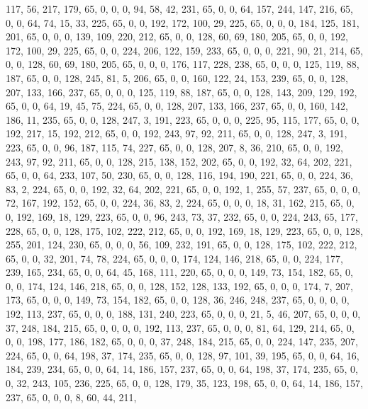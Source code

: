 \begin{DoxyCode}
       117, 56, 217, 179, 65, 0, 0, 0, 94, 58, 42, 231, 65, 0, 0, 64, 157, 244, 147, 216, 65, 0, 0, 64, 74, 15, 33,
       225, 65, 0, 0, 192, 172, 100, 29, 225, 65, 0, 0, 0, 184, 125, 181, 201, 65, 0, 0, 0, 139, 109, 220, 212, 65,
       0, 0, 128, 60, 69, 180, 205, 65, 0, 0, 192, 172, 100, 29, 225, 65, 0, 0, 224, 206, 122, 159, 233, 65, 0, 0,
       0, 221, 90, 21, 214, 65, 0, 0, 128, 60, 69, 180, 205, 65, 0, 0, 0, 176, 117, 228, 238, 65, 0, 0, 0, 125, 119,
       88, 187, 65, 0, 0, 128, 245, 81, 5, 206, 65, 0, 0, 160, 122, 24, 153, 239, 65, 0, 0, 128, 207, 133, 166,
       237, 65, 0, 0, 0, 125, 119, 88, 187, 65, 0, 0, 128, 143, 209, 129, 192, 65, 0, 0, 64, 19, 45, 75, 224, 65, 0,
       0, 128, 207, 133, 166, 237, 65, 0, 0, 160, 142, 186, 11, 235, 65, 0, 0, 128, 247, 3, 191, 223, 65, 0, 0, 0,
       225, 95, 115, 177, 65, 0, 0, 192, 217, 15, 192, 212, 65, 0, 0, 192, 243, 97, 92, 211, 65, 0, 0, 128, 247, 3,
       191, 223, 65, 0, 0, 96, 187, 115, 74, 227, 65, 0, 0, 128, 207, 8, 36, 210, 65, 0, 0, 192, 243, 97, 92, 211,
       65, 0, 0, 128, 215, 138, 152, 202, 65, 0, 0, 192, 32, 64, 202, 221, 65, 0, 0, 64, 233, 107, 50, 230, 65, 0,
       0, 128, 116, 194, 190, 221, 65, 0, 0, 224, 36, 83, 2, 224, 65, 0, 0, 192, 32, 64, 202, 221, 65, 0, 0, 192,
       1, 255, 57, 237, 65, 0, 0, 0, 72, 167, 192, 152, 65, 0, 0, 224, 36, 83, 2, 224, 65, 0, 0, 0, 18, 31, 162,
       215, 65, 0, 0, 192, 169, 18, 129, 223, 65, 0, 0, 96, 243, 73, 37, 232, 65, 0, 0, 224, 243, 65, 177, 228, 65,
       0, 0, 128, 175, 102, 222, 212, 65, 0, 0, 192, 169, 18, 129, 223, 65, 0, 0, 128, 255, 201, 124, 230, 65, 0, 0,
       0, 56, 109, 232, 191, 65, 0, 0, 128, 175, 102, 222, 212, 65, 0, 0, 32, 201, 74, 78, 224, 65, 0, 0, 0, 174,
       124, 146, 218, 65, 0, 0, 224, 177, 239, 165, 234, 65, 0, 0, 64, 45, 168, 111, 220, 65, 0, 0, 0, 149, 73,
       154, 182, 65, 0, 0, 0, 174, 124, 146, 218, 65, 0, 0, 128, 152, 128, 133, 192, 65, 0, 0, 0, 174, 7, 207, 173,
       65, 0, 0, 0, 149, 73, 154, 182, 65, 0, 0, 128, 36, 246, 248, 237, 65, 0, 0, 0, 0, 192, 113, 237, 65, 0, 0, 0,
       188, 131, 240, 223, 65, 0, 0, 0, 21, 5, 46, 207, 65, 0, 0, 0, 37, 248, 184, 215, 65, 0, 0, 0, 0, 192, 113,
       237, 65, 0, 0, 0, 81, 64, 129, 214, 65, 0, 0, 0, 198, 177, 186, 182, 65, 0, 0, 0, 37, 248, 184, 215, 65, 0,
       0, 224, 147, 235, 207, 224, 65, 0, 0, 64, 198, 37, 174, 235, 65, 0, 0, 128, 97, 101, 39, 195, 65, 0, 0, 64,
       16, 184, 239, 234, 65, 0, 0, 64, 14, 186, 157, 237, 65, 0, 0, 64, 198, 37, 174, 235, 65, 0, 0, 32, 243, 105,
       236, 225, 65, 0, 0, 128, 179, 35, 123, 198, 65, 0, 0, 64, 14, 186, 157, 237, 65, 0, 0, 0, 8, 60, 44, 211,

\end{DoxyCode}
